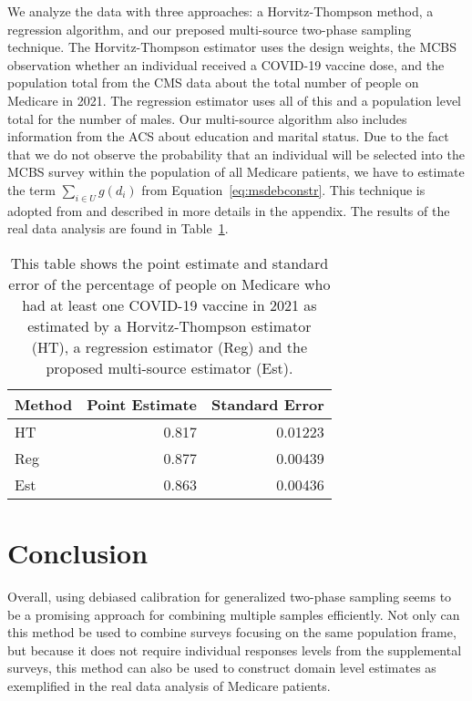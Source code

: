 \documentclass[12pt]{article}
\begin{document}
We analyze the data with three approaches: a Horvitz-Thompson method, a
regression algorithm, and our preposed multi-source two-phase sampling technique. 
The Horvitz-Thompson estimator uses the design weights, the MCBS observation
whether an individual received a COVID-19 vaccine dose, and the population total
from the CMS data about the total number of people on Medicare in 2021. The
regression estimator uses all of this and a population level total for the
number of males. Our multi-source algorithm also includes information from the
ACS about education and marital status. Due to the fact that we do not observe
the probability that an individual will be selected into the MCBS survey within
the population of all Medicare patients, we have to estimate the term $\sum_{i
\in U} g(d_i)$ from Equation~\ref{eq:msdebconstr}. This technique is adopted
from \cite{kwon2024debiased} and described in more details in the appendix.
The results of the real data analysis are found in Table~\ref{tab:mcbsres}.

\begin{table}[ht!]
  \centering
  \label{tab:mcbsres}
  \begin{tabular}{lrr}
    \toprule
    Method & Point Estimate & Standard Error \\
    \midrule
    HT  & 0.817 & 0.01223 \\
    Reg & 0.877 & 0.00439 \\
    Est & 0.863 & 0.00436 \\ 
    \bottomrule
  \end{tabular}
  \caption{This table shows the point estimate and standard error of the
  percentage of people on Medicare who had at least one COVID-19 vaccine in
  2021 as estimated by a Horvitz-Thompson estimator (HT), a regression estimator
  (Reg) and the proposed multi-source estimator (Est).}
\end{table}

\section{Conclusion}

Overall, using debiased calibration for generalized two-phase sampling seems to
be a promising approach for combining multiple samples efficiently. Not only can
this method be used to combine surveys focusing on the same population frame,
but because it does not require individual responses levels from the
supplemental surveys, this method can also be used to construct domain level
estimates as exemplified in the real data analysis of Medicare patients.
\end{document}
